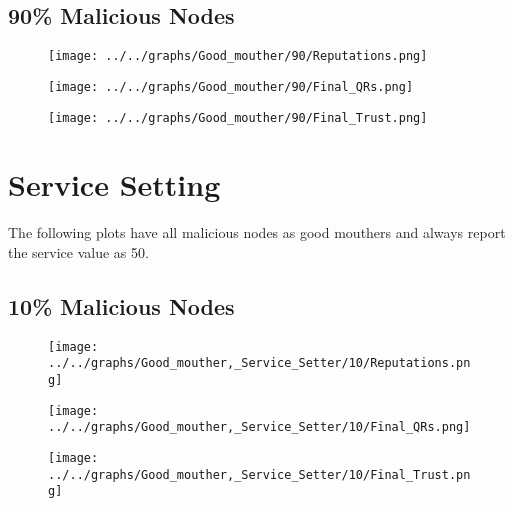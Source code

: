\begin{minipage}[t]{0.49\columnwidth}
\subsection*{90\% Malicious Nodes}
    \begin{figure}[H]
        \centering
        \texttt{[image: ../../graphs/Good\_mouther/90/Reputations.png]}
    \end{figure}
    \begin{figure}[H]
        \centering
        \texttt{[image: ../../graphs/Good\_mouther/90/Final\_QRs.png]}
    \end{figure}
\end{minipage}
\begin{minipage}[t]{0.49\columnwidth}
    \begin{figure}[H]
        \centering
        \texttt{[image: ../../graphs/Good\_mouther/90/Final\_Trust.png]}
    \end{figure}
\end{minipage}
\newpage

\section*{Service Setting}
The following plots have all malicious nodes as good mouthers and always
report the service value as 50.
\\
\begin{minipage}[t]{0.49\columnwidth}
\subsection*{10\% Malicious Nodes}
    \begin{figure}[H]
        \centering
        \texttt{[image: ../../graphs/Good\_mouther,\_Service\_Setter/10/Reputations.png]}
    \end{figure}
    \begin{figure}[H]
        \centering
        \texttt{[image: ../../graphs/Good\_mouther,\_Service\_Setter/10/Final\_QRs.png]}
    \end{figure}
\end{minipage}
\begin{minipage}[t]{0.49\columnwidth}
    \begin{figure}[H]
        \centering
        \texttt{[image: ../../graphs/Good\_mouther,\_Service\_Setter/10/Final\_Trust.png]}
    \end{figure}
\end{minipage}

